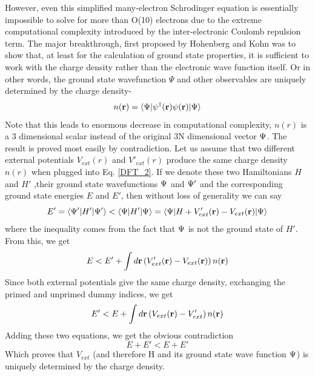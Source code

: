 \documentclass[10pt]{ruthesis}
\begin{document}
However, even this simplified many-electron Schrodinger equation is essentially impossible to solve for more than O(10) electrons due to the extreme computational complexity introduced by the inter-electronic Coulomb repulsion term. The major breakthrough, first proposed by Hohenberg and Kohn \cite{Hohenberg_Kohn} was to show that, at least for the calculation of ground state properties, it is sufficient to work with the charge density rather than the electronic wave function itself. Or in other words, the ground state wavefunction $\Psi$ and other observables are uniquely determined  by the charge density-
\begin{equation}
n(\mathbf{r})= \langle \Psi|\psi^\dagger (\mathbf{r}) \psi(\mathbf{r}) | \Psi\rangle 
\end{equation}
Note that this leads to enormous decrease in computational complexity, $n(r)$ is a 3 dimensional scalar instead of the original 3N dimensional vector $\Psi$.  The result is proved most easily by contradiction. Let us assume that two different external potentials $V_{ext} (r)$ and $V'_{ext} (r)$ produce the same charge density $n(r)$
when plugged into Eq. \ref{DFT_2}. If we denote these two Hamiltonians $H$ and $H'$ ,their ground state wavefunctions $\Psi$ and $\Psi'$ and the corresponding ground state energies $E$ and $E'$, then without loss of generality we can say
\begin{equation}
E'=\langle \Psi' | H' |\Psi' \rangle < \langle \Psi | H' |\Psi \rangle = \langle \Psi | H + V'_{ext} (\mathbf{r}) -V_{ext} (\mathbf{r})   |\Psi \rangle
\end{equation}
where the inequality comes from the fact that $\Psi$ is not the ground state of $H'$. From this, we get
\begin{equation}
E < E' + \int d\mathbf{r} \left( V'_{ext} (\mathbf{r}) -V_{ext}(\mathbf{r}) \right) n(\mathbf{r})
\end{equation}
Since both external potentials give the same charge density, exchanging the primed and unprimed dummy indices, we get
\begin{equation}
E' < E + \int d\mathbf{r} \left( V_{ext} (\mathbf{r}) -V'_{ext} \right) n(\mathbf{r})
\end{equation}
Adding these two equations, we get the obvious contradiction
\begin{equation}
E+E' < E+E'
\end{equation}
 Which proves that $V_{ext}$ (and therefore H and its ground state wave function $\Psi$) is uniquely determined by the charge density.
\end{document}

